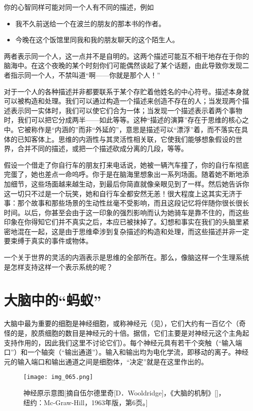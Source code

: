 你的心智同样可能对同一个人有不同的描述，例如
\begin{itemize}
\item 我不久前送给一个在波兰的朋友的那本书的作者。
\item 今晚在这个饭馆里同我和我的朋友聊天的这个陌生人。
\end{itemize}
两者表示同一个人，这一点并不是自明的。这两个描述可能互不相干地存在于你的脑海中。在这个夜晚的某个时刻你们可能偶然谈起了某个话题，由此导致你发现二者指示同一个人，不禁叫道“啊——你就是那个人！”

对于一个人的各种描述并非都要联系于某个存贮着他姓名的中心符号。描述本身就可以被构造和处理。我们可以通过构造一个描述来创造不存在的人；当发现两个描述表示同一实体时，我们可以使它们合为一体；当发现一个描述表示着两个事物时，我们可以把它分成两半——如此等等。这种“描述的演算”存在于思维的核心之中。它被称作是“内涵的”而非“外延的”，意思是描述可以“漂浮”着，而不落实在具体的已知客体上。思维的内涵性与其灵活性相关联，它使我们能够想象假设的世界，合并不同的描述，或把一个描述砍成分离的几段，等等。

假设一个借走了你自行车的朋友打来电话说，她被一辆汽车撞了，你的自行车彻底完蛋了，她也差点一命呜呼。你于是在脑海里想象出一系列场面。随着她不断地添加细节，这些场面越来越生动，到最后你简直就像亲眼见到了一样。然后她告诉你这一切只不过是一个玩笑，她和自行车全都安然无恙！很大程度上这其实无济于事：那个故事和那些场景的生动性丝毫不受影响，而且这段记忆将伴随你很长很长时间。以后，你甚至会由于这一印象的强烈影响而认为她骑车是靠不住的，而这些印象在你得知它们并不真实之后，本应已被抹掉了。幻想和事实在我们的头脑里紧密地混在一起，这是由于思维牵涉到复杂描述的构造和处理，而这些描述并非一定要束缚于真实的事件或物体。

一个关于世界的灵活的内涵表示是思维的全部所在。那么，像脑这样一个生理系统是怎样支持这样一个表示系统的呢？

\section{大脑中的“蚂蚁”}

大脑中最为重要的细胞是神经细胞，或称神经元（见），它们大约有一百亿个（奇怪的是，胶质细胞的数目是神经元的十倍。据信，它们主要是对神经元这个主角起支持作用的，因此我们这里不讨论它们）。每个神经元具有若干个突触（“输入端口”）和一个轴突（“输出通道”）。输入和输出均为电化学流，即移动的离子。神经元的输入端口和输出通道之间是细胞体，“决定”就是在这里作出的。

\begin{figure}
\texttt{[image: img\_065.png]}
\caption[神经元示意图。]
  {神经原示意图[摘自伍尔德里奇[D．Wooldridge]，《大脑的机制》[]，纽约：Mc-Graw-Hill，1963年版，第6页。]}
\end{figure}

